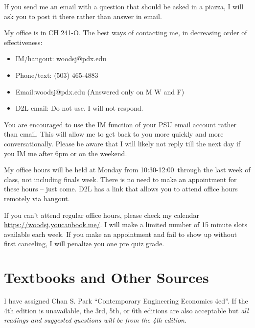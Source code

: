 \documentclass[letterpaper,10pt]{article}
\newcommand{\Office}{at Monday from 10:30-12:00}
\begin{document}
If you send me an email with a question that should be asked in a piazza, I
will ask you to post it there rather than answer in email.


 
My office is in CH 241-O.  The best ways of contacting me, in
decreasing order of effectiveness:
\begin{itemize}
\item IM/hangout: woodsj@pdx.edu
\item Phone/text: (503) 465-4883
\item Email:woodsj@pdx.edu (Answered only on M W and F)
\item D2L email: Do not use.  I will not respond.
\end{itemize}

You are encouraged to use the IM function of your PSU email account rather than email. This will allow me to get back to you more quickly and more conversationally. Please be aware that I will likely not reply till the next day if you IM me after 6pm or on the weekend.  

My office hours will be held \Office ~through the last week of class, not including finals week. There is no need to make an appointment for these hours -- just come.  D2L has a link that allows you to attend office hours remotely via hangout.



If you can’t attend regular office hours, please check my calendar \url{https://woodsj.youcanbook.me/}. I will make a limited number of 15 minute slots available each week. If you make an appointment and fail to show up without first canceling, I will penalize you one pre quiz grade.  



\section{Textbooks and Other Sources}
I have assigned Chan S. Park ``Contemporary Engineering Economics
4ed''.  If the 4th edition is unavailable, the 3rd, 5th, or 6th editions are also
acceptable but \emph{all readings and suggested questions will be from
  the 4th edition.} 
  
\end{document}
